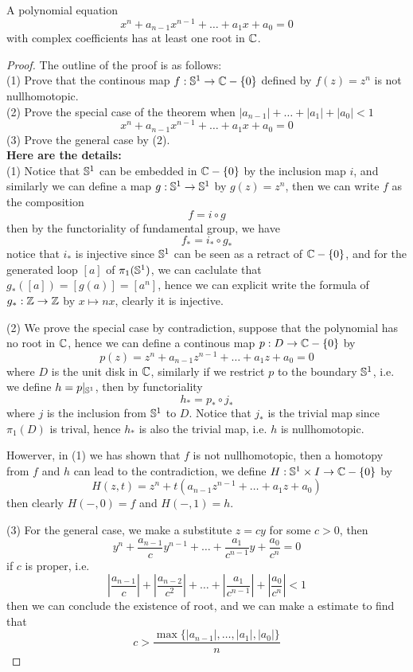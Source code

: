 \begin{theorem}
    A polynomial equation
    \[x^n+a_{n-1}x^{n-1}+\dots+a_1x+a_0 = 0\]
    with complex coefficients has at least one root in \(\mathbb{C}\).
\end{theorem}

\begin{proof}
    The outline of the proof is as follows:\\
    (1) Prove that the continous map \(f: \mathbb{S}^1 \to \mathbb{C}-\{0\}\) defined by \(f(z) = z^n\) is not nullhomotopic.\\
    (2) Prove the special case of the theorem when \(|a_{n-1}|+\dots+|a_1|+|a_0|<1\)
    \[x^n+a_{n-1}x^{n-1}+\dots+a_1x+a_0 = 0\]
    (3) Prove the general case by (2).\\

   \textbf{ Here are the details:}\\
    (1) Notice that \(\mathbb{S}^1\) can be embedded in \(\mathbb{C}-\{0\}\) by the inclusion map \(i\), and similarly we can define a map \(g:\mathbb{S}^1 \to \mathbb{S}^1\) by \(g(z) = z^n\), then we can write \(f\) as the composition
    \[f=i \circ g\]
    then by the functoriality of fundamental group, we have
    \[f_* = i_* \circ g_*\]
    notice that \(i_*\) is injective since \(\mathbb{S}^1\) can be seen as a retract of \(\mathbb{C}-\{0\}\), and for the generated loop \([a]\) of \(\pi_1(\mathbb{S}^1)\), we can caclulate that \(g_*([a]) = [g(a)] = [a^n]\), hence we can explicit write the formula of \(g_*:\mathbb{Z} \to \mathbb{Z}\) by \(x \mapsto nx\), clearly it is injective.
    
    (2) We prove the special case by contradiction, suppose that the polynomial has no root in \(\mathbb{C}\), hence we can define a continous map \(p:D \to \mathbb{C}-\{0\} \) by 
    \[p(z) = z^n+a_{n-1}z^{n-1}+\dots+a_1z+a_0 = 0\]
    where \(D\) is the unit disk in \(\mathbb{C}\), similarly if we restrict \(p\) to the boundary \(\mathbb{S}^1\), i.e. we define \(h = p|_{\mathbb{S}^1}\), then by functoriality
    \[h_* = p_* \circ j_*\]
    where \(j\) is the inclusion from \(\mathbb{S}^1\) to \(D\). Notice that \(j_*\) is the trivial map since \(\pi_1(D)\) is trival, hence \(h_*\) is also the trivial map, i.e. \(h\) is nullhomotopic.

    Howerver, in (1) we has shown that \(f\) is not nullhomotopic, then a homotopy from \(f\) and \(h\) can lead to the contradiction, we define \(H:\mathbb{S}^1 \times I \to \mathbb{C}-\{0\}\) by 
    \[H(z,t) = z^n+t(a_{n-1}z^{n-1}+\dots+a_1z+a_0)\]
    then clearly \(H(-,0) = f\) and \(H(-,1) = h\).

    (3) For the general case, we make a substitute \(z = cy\) for some \(c>0\), then
    \[y^n + \frac{a_{n-1}}{c}y^{n-1}+\dots+\frac{a_1}{c^{n-1}}y+\frac{a_0}{c^n} = 0\]
    if \(c\) is proper, i.e.
    \[|\frac{a_{n-1}}{c}|+|\frac{a_{n-2}}{c^2}|+\dots+|\frac{a_1}{c^{n-1}}|+|\frac{a_0}{c^n}| < 1\]
    then we can conclude the existence of root, and we can make a estimate to find that
    \[c>\frac{\max\{{|a_{n-1}|,\dots,|a_1|,|a_0|}\}}{n}\]
\end{proof}

